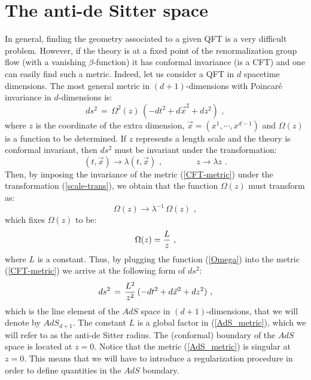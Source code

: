 \documentclass[12pt,notitlepage,a4paper]{article}
\newcommand{\beq}{\begin{equation}}
\newcommand{\eeq}{\end{equation}}
\begin{document}
\section{The anti-de Sitter space}
\label{sec:2}
In general, finding the geometry associated to a given QFT is a very difficult problem. However, if the theory is at a fixed point of the renormalization group flow (with a vanishing $\beta$-function) it has conformal invariance (is a CFT) and one can easily find such a metric. Indeed,  let us consider a QFT in $d$ spacetime dimensions. 
The most general metric in $(d+1)$-dimensions with Poincar\'e invariance in $d$-dimensions is:
\beq
ds^2\,=\,\Omega^2(z)\,(-dt^2+d\vec x^2+dz^2)\,\,,
\label{CFT-metric}
\eeq
where  $z$  is the coordinate of the  extra dimension, $\vec x=(x^1,\cdots, x^{d-1})$ and 
$\Omega(z)$ is a function to be determined.
If $z$ represents a length scale and the theory is conformal invariant, then $ds^2$ must be invariant under the transformation:
\beq
(t,\vec x)\to \lambda (t,\vec x)\,\,,
\qquad\qquad
z\to \lambda z\,\,.
\label{scale-trans}
\eeq
Then, by imposing  the invariance of  the metric (\ref{CFT-metric}) under the transformation (\ref{scale-trans}), we obtain that the function  $\Omega(z)$ must transform as:
\beq
\Omega(z)\to \lambda^{-1}\,\Omega(z)\,\,,
\eeq
which fixes $\Omega(z)$ to be:
\beq
\Omega(z)={L\over z}\,\,,
\label{Omega}
\eeq
where $L$ is a constant. Thus, by plugging the function (\ref{Omega}) into  the metric (\ref{CFT-metric}) we arrive at the following form of $ds^2$: 
\beq
ds^2\,=\,{L^2\over z^2}\,(-dt^2+d\vec x^2+dz^2)\,\,,
\label{AdS_metric}
\eeq
which is the line element of the $AdS$ space  in $(d+1)$-dimensions, that we will denote by $AdS_{d+1}$.  The constant $L$ is a global factor in (\ref{AdS_metric}), which we will refer to as the anti-de Sitter radius. 
The (conformal) boundary of the $AdS$ space is located at $z=0$. Notice that the metric (\ref{AdS_metric}) is singular at $z=0$. This means that  we will have to introduce a regularization procedure in order to define quantities in the $AdS$ boundary. 
\end{document}
